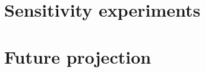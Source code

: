 

\section{Sensitivity experiments} %
\label{sec:sensitivity_experiments}


\section{Future projection} %
\label{sec:future_projection}

